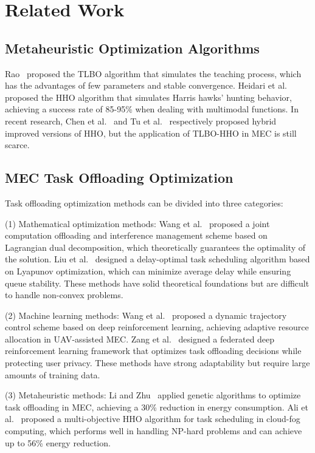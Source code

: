 \documentclass[conference]{IEEEtran}
\begin{document}
\section{Related Work}
\subsection{Metaheuristic Optimization Algorithms}
Rao~\cite{b5} proposed the TLBO algorithm that simulates the teaching process, which has the advantages of few parameters and stable convergence. Heidari et al.~\cite{b6} proposed the HHO algorithm that simulates Harris hawks' hunting behavior, achieving a success rate of 85-95\% when dealing with multimodal functions. In recent research, Chen et al.~\cite{b7} and Tu et al.~\cite{b8} respectively proposed hybrid improved versions of HHO, but the application of TLBO-HHO in MEC is still scarce.

\subsection{MEC Task Offloading Optimization}
Task offloading optimization methods can be divided into three categories:

(1) Mathematical optimization methods: Wang et al.~\cite{b9} proposed a joint computation offloading and interference management scheme based on Lagrangian dual decomposition, which theoretically guarantees the optimality of the solution. Liu et al.~\cite{b10} designed a delay-optimal task scheduling algorithm based on Lyapunov optimization, which can minimize average delay while ensuring queue stability. These methods have solid theoretical foundations but are difficult to handle non-convex problems.

(2) Machine learning methods: Wang et al.~\cite{b11} proposed a dynamic trajectory control scheme based on deep reinforcement learning, achieving adaptive resource allocation in UAV-assisted MEC. Zang et al.~\cite{b13} designed a federated deep reinforcement learning framework that optimizes task offloading decisions while protecting user privacy. These methods have strong adaptability but require large amounts of training data.

(3) Metaheuristic methods: Li and Zhu~\cite{b12} applied genetic algorithms to optimize task offloading in MEC, achieving a 30\% reduction in energy consumption. Ali et al.~\cite{b14} proposed a multi-objective HHO algorithm for task scheduling in cloud-fog computing, which performs well in handling NP-hard problems and can achieve up to 56\% energy reduction.
\end{document}
